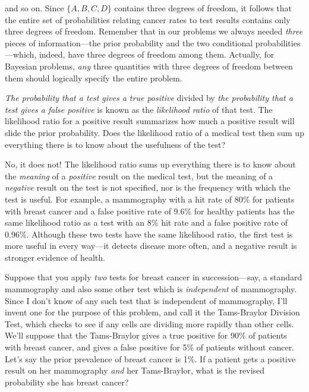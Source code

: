 { and so on. Since $\{A,B,C,D\}$
contains three degrees of freedom, it follows that the entire set of
probabilities relating cancer rates to test results contains only three
degrees of freedom. Remember that in our problems we always needed
\textit{three} pieces of information---the prior probability and the
two conditional probabilities---which, indeed, have three degrees of
freedom among them. Actually, for Bayesian problems, \textit{any} three
quantities with three degrees of freedom between them should logically
specify the entire problem.

\hr


 \textit{The probability that a test gives a true positive} divided
by \textit{the probability that a }\textit{test gives a false positive}
is known as the \textit{likelihood ratio} of that test. The likelihood
ratio for a positive result summarizes how much a positive result will
slide the prior probability. Does the likelihood ratio of a medical
test then sum up everything there is to know about the usefulness of
the test?


 No, it does not! The likelihood ratio sums up everything there is
to know about the \textit{meaning} of a \textit{positive} result on the
medical test, but the meaning of a \textit{negative} result on the test
is not specified, nor is the frequency with which the test is useful.
For example, a mammography with a hit rate of 80\% for patients with
breast cancer and a false positive rate of 9.6\% for healthy patients
has the same likelihood ratio as a test with an 8\% hit rate and a
false positive rate of 0.96\%. Although these two tests have the same
likelihood ratio, the first test is more useful in every way---it
detects disease more often, and a negative result is stronger evidence
of health.

\hr

 Suppose that you apply \textit{two} tests for breast cancer in
succession---say, a standard mammography and also some other test which
is \textit{independent} of mammography. Since I don't
know of any such test that is independent of mammography,
I'll invent one for the purpose of this problem, and
call it the Tams-Braylor Division Test, which checks to see if any
cells are dividing more rapidly than other cells. We'll
suppose that the Tams-Braylor gives a true positive for 90\% of
patients with breast cancer, and gives a false positive for 5\% of
patients without cancer. Let's say the prior prevalence
of breast cancer is 1\%. If a patient gets a positive result on her
mammography \textit{and} her Tams-Braylor, what is the revised
probability she has breast cancer?


}
